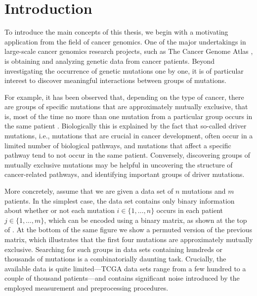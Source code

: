 \chapter{Introduction} \label{ch:intro}
To introduce the main concepts of this thesis, we begin with a motivating application from the field of cancer genomics.
One of the major undertakings in large-scale cancer genomics research projects, such as The Cancer Genome Atlas \citep{tcga}, is obtaining and analyzing genetic data from cancer patients.
Beyond investigating the occurrence of genetic mutations one by one, it is of particular interest to discover meaningful interactions between groups of mutations.

For example, it has been observed that, depending on the type of cancer, there are groups of specific mutations that are approximately mutually exclusive, that is, most of the time no more than one mutation from a particular group occurs in the same patient \citep{yeang08}.
Biologically this is explained by the fact that so-called driver mutations, i.e., mutations that are crucial in cancer development, often occur in a limited number of biological pathways, and mutations that affect a specific pathway tend to not occur in the same patient.
Conversely, discovering groups of mutually exclusive mutations may be helpful in uncovering the structure of cancer-related pathways, and identifying important groups of driver mutations.

More concretely, assume that we are given a data set of $n$ mutations and $m$ patients.
In the simplest case, the data set contains only binary information about whether or not each mutation $i \in \{1,\ldots,n\}$ occurs in each patient $j \in \{1,\ldots,m\}$, which can be encoded using a binary matrix, as shown at the top of .
At the bottom of the same figure we show a permuted version of the previous matrix, which illustrates that the first four mutations are approximately mutually exclusive.
Searching for such groups in data sets containing hundreds or thousands of mutations is a combinatorially daunting task.
Crucially, the available data is quite limited---TCGA data sets range from a few hundred to a couple of thousand patients---and contains significant noise introduced by the employed measurement and preprocessing procedures.

